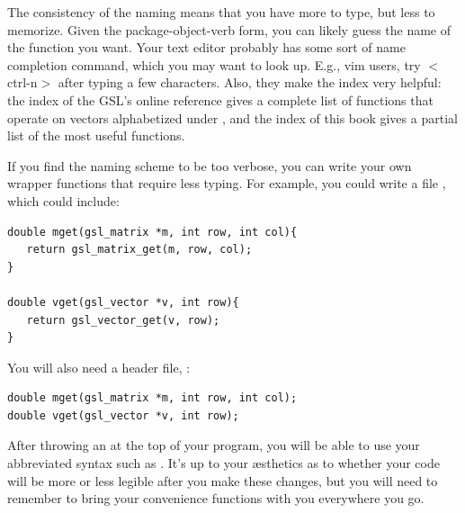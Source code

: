 The consistency of the naming means that you have more to type, but
less to memorize. Given the package-object-verb form, you can likely
guess the name of the function you want. Your text editor probably has
some sort of name completion command, which you may want to look up. E.g.,
vim users, try $<$ctrl-n$>$ after typing a few characters. Also, they
make the index very helpful: the index of the GSL's online reference
gives a complete list of functions that operate on vectors alphabetized
under , and the index of this book gives a partial
list of the most useful functions.


If you find the naming scheme to be too verbose, you can 
write your own wrapper functions that require less typing. For example, you
could write a file , which could include:

\begin{lstlisting}
double mget(gsl_matrix *m, int row, int col){
   return gsl_matrix_get(m, row, col);
}

double vget(gsl_vector *v, int row){
   return gsl_vector_get(v, row);
}
\end{lstlisting}

You will also need a header file, :
\begin{lstlisting}
double mget(gsl_matrix *m, int row, int col);
double vget(gsl_vector *v, int row);
\end{lstlisting}

After throwing an  at the top of your
program, you will be able to use your abbreviated syntax such as .
It's up to your \ae sthetics as to whether your code will be more or less
legible after you make these changes, but you will need to remember to
bring your convenience functions with you everywhere you go.


